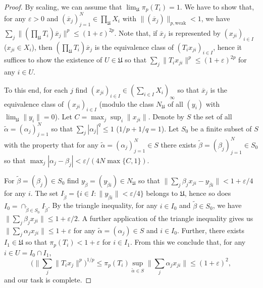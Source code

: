 \documentclass{amsart}
\theoremstyle{plain}
\theoremstyle{definition}
\numberwithin{equation}{section}
\newcommand{\vr}{\varepsilon}
\begin{document}
\begin{proof}
By scaling, we can assume that $\lim_{\mathfrak U} \pi_p(T_i) = 1$.
We have to show that, for any $\vr > 0$ and $(\overline{x}_j)_{j=1}^N \in \prod_{\mathfrak U} X_i$ with $\|(\overline{x}_j)\|_{p,\textrm{weak}} < 1$, we have $\sum_j \| (\prod_{\mathfrak{U}} T_i) \overline{x}_j\|^p \leq (1+\vr)^{2p}$.
Note that, if $\overline{x}_j$ is represented by $(x_{ji})_{i \in I}$ ($x_{ji} \in X_i$), then $(\prod_{\mathfrak{U}} T_i) \overline{x}_j$ is the equivalence class of $(T_i x_{ji})_{i \in I}$, hence it suffices to show the existence of $U \in {\mathfrak{U}}$ so that $\sum_j \|T_i x_{ji}\|^p \leq (1+\vr)^{2p}$ for any $i \in U$.

To this end, for each $j$ find $(x_{ji})_{i \in I} \in (\sum_{i \in I} X_i)_\infty$ so that $\overline{x}_j$ is the equivalence class of $(x_{ji})_{i \in I}$ (modulo the class $N_{\mathfrak{U}}$ of all $(y_i)$ with $\lim_{\mathfrak{U}} \|y_i\| = 0$). Let $C = \max_j \sup_i \|x_{ji}\|$.
Denote by $S$ the set of all $\widetilde{\alpha} = (\alpha_j)_{j=1}^N$ so that $\sum_j |\alpha_j|^q \leq 1$ ($1/p + 1/q = 1$). Let $S_0$ be a finite subset of $S$ with the property that for any $\widetilde{\alpha} = (\alpha_j)_{j=1}^N \in S$ there exists $\widetilde{\beta} = (\beta_j)_{j=1}^N \in S_0$ so that $\max_j |\alpha_j - \beta_j| < \vr/(4N\max\{C,1\})$.

For $\widetilde{\beta} = (\beta_j) \in S_0$ find $y_{\widetilde{\beta}} = (y_{\widetilde{\beta}i}) \in N_{\mathfrak{U}}$ so that $\|\sum_j \beta_j x_{ji} - y_{\widetilde{\beta}i}\| < 1 + \vr/4$ for any $i$. The set $I_{\widetilde{\beta}} = \{i \in I : \|y_{\widetilde{\beta}i}\| < \vr/4\}$ belongs to ${\mathfrak{U}}$, hence so does $I_0 = \cap_{\widetilde{\beta} \in S_0} I_{\widetilde{\beta}}$. 
By the triangle inequality, for any $i \in I_0$ and $\widetilde{\beta} \in S_0$, we have $\big\| \sum_j \beta_j x_{ji} \big\| \leq 1 + \vr/2$. A further application of the triangle inequality gives us $\big\| \sum_j \alpha_j x_{ji} \big\| \leq 1 + \vr$ for any $\widetilde{\alpha} = (\alpha_j) \in S$ and $i \in I_0$.
Further, there exists $I_1 \in {\mathfrak{U}}$ so that $\pi_p(T_i) < 1+\vr$ for $i \in I_1$. From this we conclude that, for any $i \in U = I_0 \cap I_1$, 
$$
\big( \|\sum_j \|T_i x_j\|^p \big)^{1/p} \leq \pi_p(T_i) \sup_{\widetilde{\alpha} \in S} \big\| \sum_j \alpha_j x_{ji} \big\| \leq (1+\vr)^2 ,
$$
and our task is complete.
\end{proof}
\end{document}
